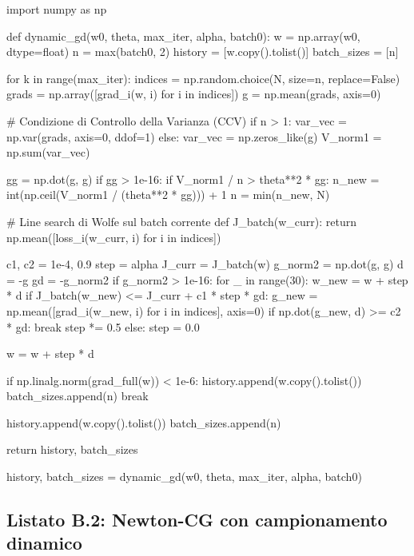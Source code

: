 \documentclass[a4paper,12pt]{article}
\numberwithin{equation}{section}
\numberwithin{figure}{section}
\numberwithin{table}{section}
\begin{document}
\begin{pythoncode}[title= Dynamic GD]

import numpy as np

def dynamic_gd(w0, theta, max_iter, alpha, batch0):
    w = np.array(w0, dtype=float)
    n = max(batch0, 2)
    history     = [w.copy().tolist()]
    batch_sizes = [n]

    for k in range(max_iter):
        indices = np.random.choice(N, size=n, replace=False)
        grads = np.array([grad_i(w, i) for i in indices])
        g = np.mean(grads, axis=0)

        # Condizione di Controllo della Varianza (CCV)
        if n > 1:
            var_vec = np.var(grads, axis=0, ddof=1)
        else:
            var_vec = np.zeros_like(g)
        V_norm1 = np.sum(var_vec)

        gg = np.dot(g, g)
        if gg > 1e-16:
            if V_norm1 / n > theta**2 * gg:
                n_new = int(np.ceil(V_norm1 / (theta**2 * gg))) + 1
                n = min(n_new, N)

        # Line search di Wolfe sul batch corrente
        def J_batch(w_curr):
            return np.mean([loss_i(w_curr, i) for i in indices])

        c1, c2 = 1e-4, 0.9
        step = alpha
        J_curr = J_batch(w)
        g_norm2 = np.dot(g, g)
        d = -g
        gd = -g_norm2
        if g_norm2 > 1e-16:
            for _ in range(30):
                w_new = w + step * d
                if J_batch(w_new) <= J_curr + c1 * step * gd:
                    g_new = np.mean([grad_i(w_new, i) for i in indices], axis=0)
                    if np.dot(g_new, d) >= c2 * gd:
                        break
                step *= 0.5
            else:
                step = 0.0

        w = w + step * d

        if np.linalg.norm(grad_full(w)) < 1e-6:
            history.append(w.copy().tolist())
            batch_sizes.append(n)
            break

        history.append(w.copy().tolist())
        batch_sizes.append(n)

    return history, batch_sizes

history, batch_sizes = dynamic_gd(w0, theta, max_iter, alpha, batch0)
\end{pythoncode}


\subsection{Listato B.2: Newton-CG con campionamento dinamico}
\end{document}
